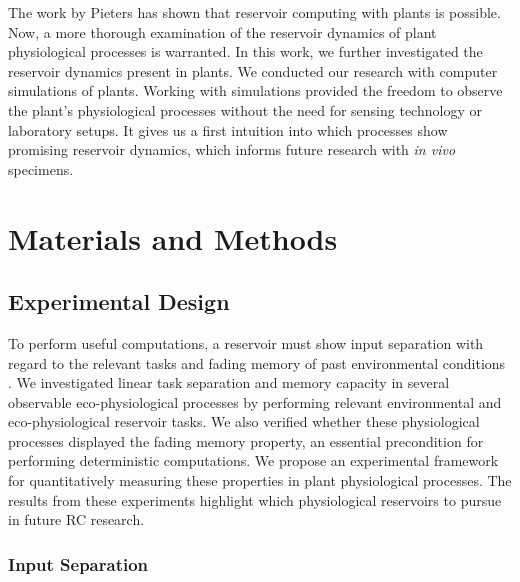 \documentclass[10pt,a4paper,journal]{IEEEtran}
\begin{document}
The work by Pieters has shown that reservoir computing with plants is possible.
Now, a more thorough examination of the reservoir dynamics of plant physiological processes is warranted.
In this work, we further investigated the reservoir dynamics present in plants.
We conducted our research with computer simulations of plants.
Working with simulations provided the freedom to observe the plant's physiological processes without the need for sensing technology or laboratory setups.
It gives us a first intuition into which processes show promising reservoir dynamics, which informs future research with \textit{in vivo} specimens.



\section{Materials and Methods}

\subsection{Experimental Design}

To perform useful computations, a reservoir must show input separation with regard to the relevant tasks and fading memory of past environmental conditions \cite{nakajima_information_2015}.
We investigated linear task separation and memory capacity in several observable eco-physiological processes by performing relevant environmental and eco-physiological reservoir tasks. 
We also verified whether these physiological processes displayed the fading memory property, an essential precondition for performing deterministic computations.
We propose an experimental framework for quantitatively measuring these properties in plant physiological processes.
The results from these experiments highlight which physiological reservoirs to pursue in future RC research.

\subsubsection{Input Separation}
\end{document}
